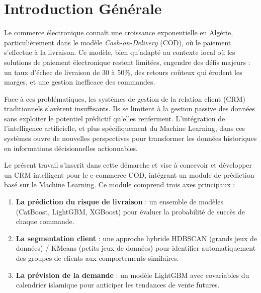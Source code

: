 \documentclass[12pt,a4paper]{report}
\begin{document}
\hypersetup{pageanchor=true}


\tableofcontents
\newpage


\chapter*{Introduction G\'{e}n\'{e}rale}

Le commerce \'{e}lectronique conna\^{i}t une croissance exponentielle en Alg\'{e}rie, particuli\`{e}rement dans le mod\`{e}le \textit{Cash-on-Delivery} (COD), o\`{u} le paiement s'effectue \`{a} la livraison. Ce mod\`{e}le, bien qu'adapt\'{e} au contexte local o\`{u} les solutions de paiement \'{e}lectronique restent limit\'{e}es, engendre des d\'{e}fis majeurs : un taux d'\'{e}chec de livraison de 30 \`{a} 50\%, des retours co\^{u}teux qui \'{e}rodent les marges, et une gestion inefficace des commandes.

Face \`{a} ces probl\'{e}matiques, les syst\`{e}mes de gestion de la relation client (CRM) traditionnels s'av\`{e}rent insuffisants. Ils se limitent \`{a} la gestion passive des donn\'{e}es sans exploiter le potentiel pr\'{e}dictif qu'elles renferment. L'int\'{e}gration de l'intelligence artificielle, et plus sp\'{e}cifiquement du Machine Learning, dans ces syst\`{e}mes ouvre de nouvelles perspectives pour transformer les donn\'{e}es historiques en informations d\'{e}cisionnelles actionnables.

Le pr\'{e}sent travail s'inscrit dans cette d\'{e}marche et vise \`{a} concevoir et d\'{e}velopper un CRM intelligent pour le e-commerce COD, int\'{e}grant un module de pr\'{e}diction bas\'{e} sur le Machine Learning. Ce module comprend trois axes principaux :

\begin{enumerate}
  \item \textbf{La pr\'{e}diction du risque de livraison} : un ensemble de mod\`{e}les (CatBoost, LightGBM, XGBoost) pour \'{e}valuer la probabilit\'{e} de succ\`{e}s de chaque commande.
  \item \textbf{La segmentation client} : une approche hybride HDBSCAN (grands jeux de donn\'{e}es) / KMeans (petits jeux de donn\'{e}es) pour identifier automatiquement des groupes de clients aux comportements similaires.
  \item \textbf{La pr\'{e}vision de la demande} : un mod\`{e}le LightGBM avec covariables du calendrier islamique pour anticiper les tendances de vente futures.
\end{enumerate}
\end{document}
